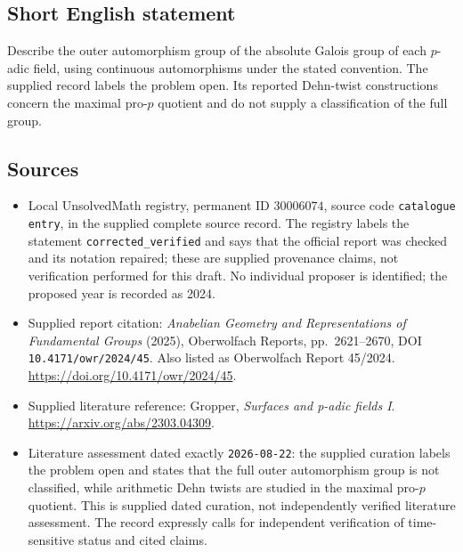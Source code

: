 \documentclass[11pt]{article}
\begin{document}
\subsection{Short English statement}
Describe the outer automorphism group of the absolute Galois group of each \(p\)-adic field, using continuous automorphisms under the stated convention. The supplied record labels the problem open. Its reported Dehn-twist constructions concern the maximal pro-\(p\) quotient and do not supply a classification of the full group.
\subsection{Sources}
\begin{itemize}
\item Local UnsolvedMath registry, permanent ID \(30006074\), source code \texttt{catalogue entry}, in the supplied complete source record. The registry labels the statement \texttt{corrected\_verified} and says that the official report was checked and its notation repaired; these are supplied provenance claims, not verification performed for this draft. No individual proposer is identified; the proposed year is recorded as 2024.
\item Supplied report citation: \emph{Anabelian Geometry and Representations of Fundamental Groups} (2025), Oberwolfach Reports, pp.\ 2621--2670, DOI \texttt{10.4171/owr/2024/45}. Also listed as Oberwolfach Report 45/2024. \url{https://doi.org/10.4171/owr/2024/45}.
\item Supplied literature reference: Gropper, \emph{Surfaces and p-adic fields I}. \url{https://arxiv.org/abs/2303.04309}.
\item Literature assessment dated exactly \texttt{2026-08-22}: the supplied curation labels the problem open and states that the full outer automorphism group is not classified, while arithmetic Dehn twists are studied in the maximal pro-\(p\) quotient. This is supplied dated curation, not independently verified literature assessment. The record expressly calls for independent verification of time-sensitive status and cited claims.
\end{itemize}
\end{document}
